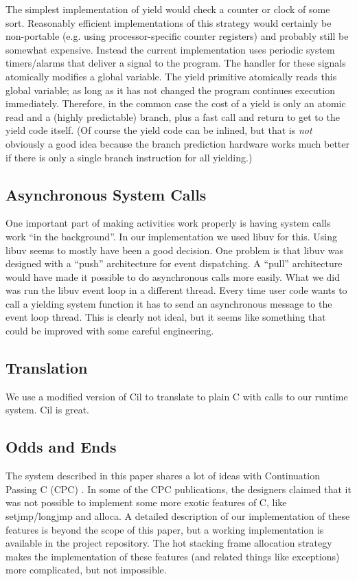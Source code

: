 \documentclass[10pt,preprint]{sigplanconf}
\begin{document}
The simplest implementation of yield would check a counter or clock of some sort.
Reasonably efficient implementations of this strategy would certainly be non-portable (e.g. using processor-specific counter registers) and probably still be somewhat expensive.
Instead the current \charcoal{} implementation uses periodic system timers/alarms that deliver a signal to the program.
The handler for these signals atomically modifies a global variable.
The yield primitive atomically reads this global variable; as long as it has not changed the program continues execution immediately.
Therefore, in the common case the cost of a yield is only an atomic read and a (highly predictable) branch, plus a fast call and return to get to the yield code itself.
(Of course the yield code can be inlined, but that is \emph{not} obviously a good idea because the branch prediction hardware works much better if there is only a single branch instruction for all yielding.)

\subsection{Asynchronous System Calls}

One important part of making activities work properly is having system calls work ``in the background''.
In our implementation we used libuv for this.
Using libuv seems to mostly have been a good decision.
One problem is that libuv was designed with a ``push'' architecture for event dispatching.
A ``pull'' architecture would have made it possible to do asynchronous calls more easily.
What we did was run the libuv event loop in a different thread.
Every time user code wants to call a yielding system function it has to send an asynchronous message to the event loop thread.
This is clearly not ideal, but it seems like something that could be improved with some careful engineering.

\subsection{Translation}

We use a modified version of Cil \cite{Necula2002} to translate \charcoal{} to plain C with calls to our runtime system.
Cil is great.

\subsection{Odds and Ends}

The system described in this paper shares a lot of ideas with Continuation Passing C (CPC) \cite{Kerneis2013}.
In some of the CPC publications, the designers claimed that it was not possible to implement some more exotic features of C, like setjmp/longjmp and alloca.
A detailed description of our implementation of these features is beyond the scope of this paper, but a working implementation is available in the project repository.
The hot stacking frame allocation strategy makes the implementation of these features (and related things like exceptions) more complicated, but not impossible.
\end{document}
